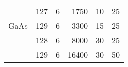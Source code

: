 \begin{table}[htbp]
\begin{center}
\begin{tabular}{p{1.5cm}ccrrr}
                      & 127                        & 6           & 1750         & 10             & 25             \\
            GaAs      & 129                        & 6           & 3300         & 15             & 25             \\
                      & 128                        & 6           & 8000         & 30             & 25             \\
                      & 129                        & 6           & 16400        & 30             & 50             \\
            \hline
        \end{tabular}
    \end{center}
\end{table}
